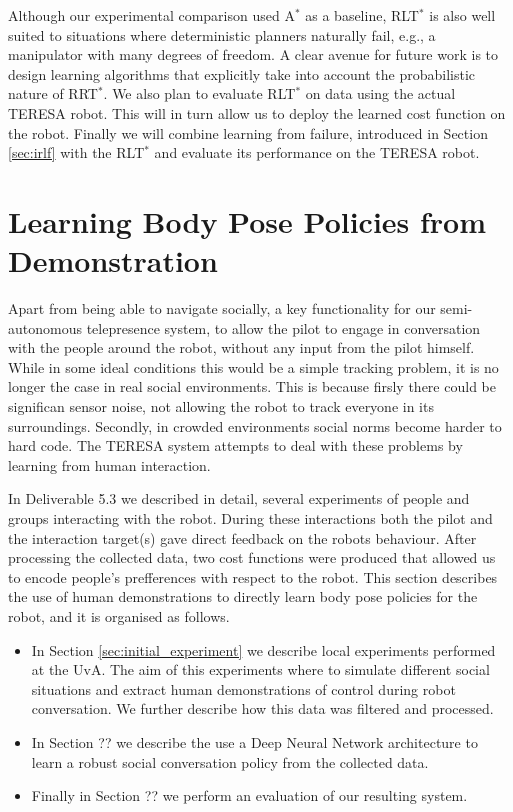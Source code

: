 \documentclass[a4paper,11pt]{report}
\begin{document}
 Although our experimental comparison used A$^*$ as a baseline, RLT$^*$ is also well suited to situations where deterministic planners naturally fail, e.g., a manipulator with many degrees of freedom. A clear avenue for future work is to design learning algorithms that explicitly take into account the probabilistic nature of RRT$^*$. We also plan to evaluate RLT$^*$ on data using the actual TERESA robot. This will in turn allow us to deploy the learned cost function on the robot. Finally we will combine learning from failure, introduced in Section \ref{sec:irlf} with the RLT$^*$ and evaluate its performance on the TERESA robot.

\clearpage





\section{Learning Body Pose Policies from Demonstration}
\label{sec:sl_policy}

Apart from being able to navigate socially, a key functionality for our semi-autonomous telepresence system, to allow the pilot to engage in conversation 
with the people around the robot, without any input from the pilot himself. While in some ideal conditions this would be a simple tracking problem, it is no longer the case in real social environments. This is because firsly there could be significan sensor noise, not allowing the robot to track everyone in its surroundings. Secondly, in crowded environments social norms become harder to hard code. The TERESA system attempts to deal with these problems by learning from human interaction.

In Deliverable 5.3 we described in detail, several experiments of people and groups interacting with the robot. During these interactions both the pilot and the interaction target(s) gave direct feedback on the robots behaviour. After processing the collected data, two cost functions were produced that allowed us to encode people's prefferences with respect to the robot. This section describes the use of human demonstrations to directly learn body pose policies for the robot, and it is organised as follows. 

\begin{itemize}
	\item In Section \ref{sec:initial_experiment} we describe local experiments performed at the UvA. The aim of this experiments where to simulate different social situations and extract human demonstrations of control during robot conversation. We further describe how this data was filtered and processed.
	\item In Section ?? we describe the use a Deep Neural Network architecture to learn a robust social conversation policy from the collected data. 
	\item Finally in Section ?? we perform an evaluation of our resulting system.
\end{itemize} 
\end{document}
